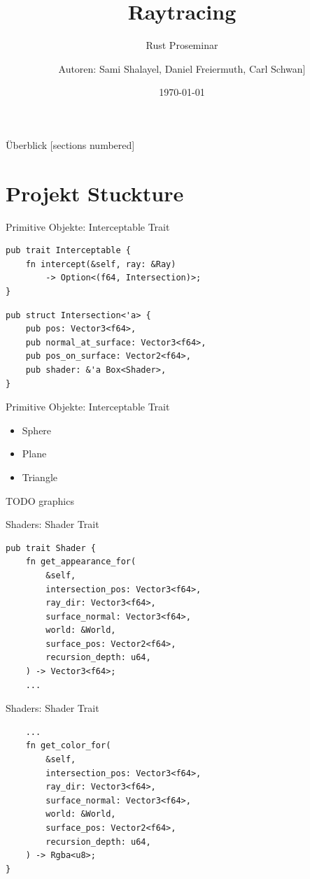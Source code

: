 \documentclass{beamer}
\title{Raytracing}
\subtitle{Rust Proseminar}
\author[Sami Shalayel, Daniel Freiermuth, Carl Schwan]{%
    Autoren: Sami Shalayel, Daniel Freiermuth, Carl Schwan]}
\institute{Universität des Saarlandes}
\date{\today}
\begin{document}
\maketitle

\begin{frame}{Überblick}
    [sections numbered]
    \tableofcontents[hideallsubsections]
\end{frame}

\section{Projekt Stuckture}
\begin{frame}[fragile]{Primitive Objekte: Interceptable Trait}
    \begin{lstlisting}
pub trait Interceptable {
    fn intercept(&self, ray: &Ray)
        -> Option<(f64, Intersection)>;
}
    \end{lstlisting}
    \begin{lstlisting}
pub struct Intersection<'a> {
    pub pos: Vector3<f64>,
    pub normal_at_surface: Vector3<f64>,
    pub pos_on_surface: Vector2<f64>,
    pub shader: &'a Box<Shader>,
}
    \end{lstlisting}
\end{frame}

\begin{frame}{Primitive Objekte: Interceptable Trait}
    \begin{itemize}
        \item Sphere
        \item Plane
        \item Triangle
    \end{itemize}
    TODO graphics
\end{frame}

\begin{frame}[fragile]{Shaders: Shader Trait}
    \begin{lstlisting}
pub trait Shader {
    fn get_appearance_for(
        &self,
        intersection_pos: Vector3<f64>,
        ray_dir: Vector3<f64>,
        surface_normal: Vector3<f64>,
        world: &World,
        surface_pos: Vector2<f64>,
        recursion_depth: u64,
    ) -> Vector3<f64>;
    ...
    \end{lstlisting}
\end{frame}

\begin{frame}[fragile]{Shaders: Shader Trait}
    \begin{lstlisting}
    ...
    fn get_color_for(
        &self,
        intersection_pos: Vector3<f64>,
        ray_dir: Vector3<f64>,
        surface_normal: Vector3<f64>,
        world: &World,
        surface_pos: Vector2<f64>,
        recursion_depth: u64,
    ) -> Rgba<u8>;
}
    \end{lstlisting}
\end{frame}
\end{document}
